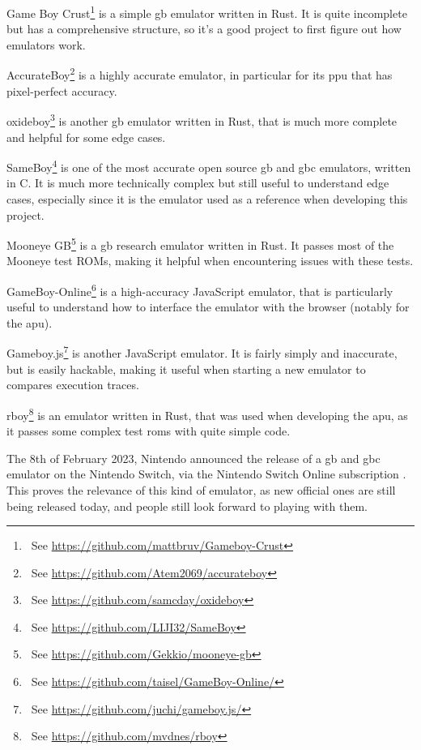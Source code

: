 \documentclass[11pt]{informatics-report}
\newcommand{\ftnt}[1]{\footnote{~See \url{#1}}}
\begin{document}
\begin{compactitem}
    \item Game Boy Crust\ftnt{https://github.com/mattbruv/Gameboy-Crust} is a simple \gls{gb} emulator written in Rust. It is quite incomplete but has a comprehensive structure, so it's a good project to first figure out how emulators work.
    \item AccurateBoy\ftnt{https://github.com/Atem2069/accurateboy} is a highly accurate emulator, in particular for its \gls{ppu} that has pixel-perfect accuracy.
    \item oxideboy\ftnt{https://github.com/samcday/oxideboy} is another \gls{gb} emulator written in Rust, that is much more complete and helpful for some edge cases.
    \item SameBoy\ftnt{https://github.com/LIJI32/SameBoy} is one of the most accurate open source \gls{gb} and \gls{gbc} emulators, written in C. It is much more technically complex but still useful to understand edge cases, especially since it is the emulator used as a reference when developing this project.
    \item Mooneye GB\ftnt{https://github.com/Gekkio/mooneye-gb} is a \gls{gb} research emulator written in Rust. It passes most of the Mooneye test ROMs, making it helpful when encountering issues with these tests.
    \item GameBoy-Online\ftnt{https://github.com/taisel/GameBoy-Online/} is a high-accuracy JavaScript emulator, that is particularly useful to understand how to interface the emulator with the browser (notably for the \gls{apu}).
    \item Gameboy.js\ftnt{https://github.com/juchi/gameboy.js/} is another JavaScript emulator. It is fairly simply and inaccurate, but is easily hackable, making it useful when starting a new emulator to compares execution traces.
    \item rboy\ftnt{https://github.com/mvdnes/rboy} is an emulator written in Rust, that was used when developing the \gls{apu}, as it passes some complex test \glspl{rom} with quite simple code.
\end{compactitem}

The 8th of February 2023, Nintendo announced the release of a \glsdesc{gb} and \glsdesc{gbc} emulator on the Nintendo Switch, via the Nintendo Switch Online subscription \cite{switch_gb_emu}. This proves the relevance of this kind of emulator, as new official ones are still being released today, and people still look forward to playing with them.
\end{document}
